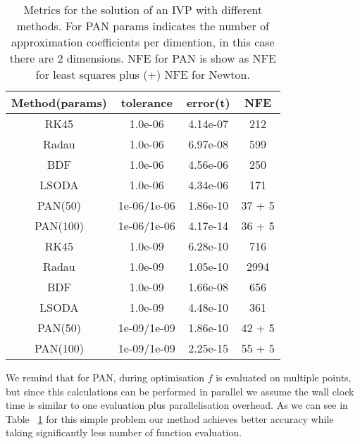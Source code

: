 \documentclass[11pt]{report}
\begin{document}
    \renewcommand{\arraystretch}{1.5}
    \renewcommand{\tabcolsep}{10.25pt}
    \begin{table}[!h]
        \begin{center}
            \caption{Metrics for the solution of an IVP with different methods. For PAN params indicates the number of
            approximation coefficients per dimention, in this case there are 2 dimensions.
            NFE for PAN is show as NFE for least squares plus (+) NFE for Newton.}
            \label{spiral-metrics}
            \begin{tabular}{|c|c|c|c|}
                \hline
                Method(params) & tolerance & error(t) & NFE \\
                \hline
                RK45 & 1.0e-06 & 4.14e-07 & 212
                \\ \hline
                Radau & 1.0e-06 & 6.97e-08 & 599
                \\ \hline
                BDF & 1.0e-06 & 4.56e-06 & 250
                \\ \hline
                LSODA & 1.0e-06 & 4.34e-06 & 171
                \\ \hline
                PAN(50) & 1e-06/1e-06 & 1.86e-10 & 37 + 5
                \\ \hline
                PAN(100) & 1e-06/1e-06 & 4.17e-14 & 36 + 5
                \\ \hline \hline
                RK45 & 1.0e-09 & 6.28e-10 & 716
                \\ \hline
                Radau & 1.0e-09 & 1.05e-10 & 2994
                \\ \hline
                BDF & 1.0e-09 & 1.66e-08 & 656
                \\ \hline
                LSODA & 1.0e-09 & 4.48e-10 & 361
                \\ \hline
                PAN(50) & 1e-09/1e-09 & 1.86e-10 & 42 + 5
                \\ \hline
                PAN(100) & 1e-09/1e-09 & 2.25e-15 & 55 + 5
                \\ \hline
            \end{tabular}
        \end{center}
    \end{table}

    We remind that for PAN, during optimisation $f$ is evaluated on multiple points, but since this calculations can be
    performed in parallel we assume the wall clock time is similar to one evaluation plus parallelisation overhead.
    As we can see in Table ~\ref{spiral-metrics} for this simple problem our method achieves better accuracy while
    taking significantly less number of function evaluation.
\end{document}
